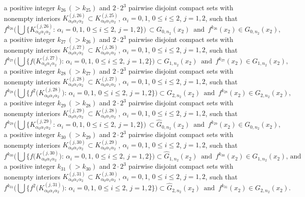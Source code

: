 \documentclass[12pt]{article}
\newcommand{\al}{\alpha}
\begin{document}
\noindent
a positive integer $k_{26} \, (> k_{25})$ and $2 \cdot 2^3$ pairwise disjoint compact sets with nonempty interiors $K_{\al_0\al_1\al_2}^{(j,26)} \subset K_{\al_0\al_1\al_2}^{(j,25)}$, $\al_i = 0, 1$, $0 \le i \le 2$, $j = 1, 2$, such that 
$$
f^{k_{26}}\bigg(\bigcup \big\{ K_{\al_0\al_1\al_2}^{(j,26)}: \, \al_i = 0, 1, \, 0 \le i \le 2, \, j = 1, 2 \big\}\bigg) \, \subset G_{0,n_2}(x_2) \,\,\, \text{and} \,\,\, f^{k_{26}}(x_2) \in G_{0,n_2}(x_2),  
$$
a positive integer $k_{27} \, (> k_{26})$ and $2 \cdot 2^3$ pairwise disjoint compact sets with nonempty interiors $K_{\al_0\al_1\al_2}^{(j,27)} \subset K_{\al_0\al_1\al_2}^{(j,26)}$, $\al_i = 0, 1$, $0 \le i \le 2$, $j = 1, 2$, such that 
$$
f^{k_{27}}\bigg(\bigcup \big\{ f\big(K_{\al_0\al_1\al_2}^{(j,27)}\big): \, \al_i = 0, 1, \, 0 \le i \le 2, \, j = 1, 2 \big\}\bigg) \subset G_{1,n_2}(x_2) \,\,\, \text{and} \,\,\, f^{k_{27}}(x_2) \in G_{1,n_2}(x_2), 
$$
a positive integer $k_{28} \, (> k_{27})$ and $2 \cdot 2^3$ pairwise disjoint compact sets with nonempty interiors $K_{\al_0\al_1\al_2}^{(j,28)} \subset K_{\al_0\al_1\al_2}^{(j,27)}$, $\al_i = 0, 1$, $0 \le i \le 2$, $j = 1, 2$, such that 
$$
f^{k_{28}}\bigg(\bigcup \big\{ f^2\big(K_{\al_0\al_1\al_2}^{(j,28)}\big): \, \al_i = 0, 1, \, 0 \le i \le 2, \, j = 1, 2 \big\}\bigg) \subset G_{2,n_2}(x_2) \,\,\, \text{and} \,\,\, f^{k_{28}}(x_2) \in G_{2,n_2}(x_2), 
$$
a positive integer $k_{29} \, (> k_{28})$ and $2 \cdot 2^3$ pairwise disjoint compact sets with nonempty interiors $K_{\al_0\al_1\al_2}^{(j,29)} \subset K_{\al_0\al_1\al_2}^{(j,28)}$, $\al_i = 0, 1$, $0 \le i \le 2$, $j = 1, 2$, such that 
$$
f^{k_{29}}\bigg(\bigcup \big\{ K_{\al_0\al_1\al_2}^{(j,29)}: \, \al_i = 0, 1, \, 0 \le i \le 2, \, j = 1, 2 \big\}\bigg) \, \subset \widehat G_{0,n_2}(x_2) \,\,\, \text{and} \,\,\, f^{k_{29}}(x_2) \in G_{0,n_2}(x_2), 
$$
a positive integer $k_{30} \, (> k_{29})$ and $2 \cdot 2^3$ pairwise disjoint compact sets with nonempty interiors $K_{\al_0\al_1\al_2}^{(j,30)} \subset K_{\al_0\al_1\al_2}^{(j,29)}$, $\al_i = 0, 1$, $0 \le i \le 2$, $j = 1, 2$, such that 
$$
f^{k_{30}}\bigg(\bigcup \big\{ f\big(K_{\al_0\al_1\al_2}^{(j,30)}\big): \, \al_i = 0, 1, \, 0 \le i \le 2, \, j = 1, 2 \big\}\bigg) \subset \widehat G_{1,n_2}(x_2) \,\,\, \text{and} \,\,\, f^{k_{30}}(x_2) \in G_{1,n_2}(x_2), \, \text{and}
$$
a positive integer $k_{31} \, (> k_{30})$ and $2 \cdot 2^3$ pairwise disjoint compact sets with nonempty interiors $K_{\al_0\al_1\al_2}^{(j,31)} \subset K_{\al_0\al_1\al_2}^{(j,30)}$, $\al_i = 0, 1$, $0 \le i \le 2$, $j = 1, 2$, such that 
$$
f^{k_{31}}\bigg(\bigcup \big\{ f^2\big(K_{\al_0\al_1\al_2}^{(j,31)}\big): \, \al_i = 0, 1, \, 0 \le i \le 2, \, j = 1, 2 \big\}\bigg) \subset \widehat G_{2,n_2}(x_2) \,\,\, \text{and} \,\,\, f^{k_{31}}(x_2) \in G_{2,n_2}(x_2).
$$
\end{document}
